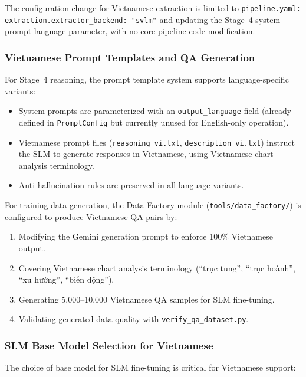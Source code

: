 The configuration change for Vietnamese extraction is limited to
\texttt{pipeline.yaml: extraction.extractor\_backend: "svlm"} and updating the
Stage~4 system prompt language parameter, with no core pipeline code modification.

\subsubsection{Vietnamese Prompt Templates and QA Generation}

For Stage~4 reasoning, the prompt template system supports language-specific variants:
\begin{itemize}
    \item System prompts are parameterized with an \texttt{output\_language} field
          (already defined in \texttt{PromptConfig} but currently unused for English-only
          operation).
    \item Vietnamese prompt files (\texttt{reasoning\_vi.txt}, \texttt{description\_vi.txt})
          instruct the SLM to generate responses in Vietnamese, using Vietnamese
          chart analysis terminology.
    \item Anti-hallucination rules are preserved in all language variants.
\end{itemize}

For training data generation, the Data Factory module (\texttt{tools/data\_factory/})
is configured to produce Vietnamese QA pairs by:
\begin{enumerate}
    \item Modifying the Gemini generation prompt to enforce 100\% Vietnamese output.
    \item Covering Vietnamese chart analysis terminology
          (``trục tung'',
          ``trục hoành'',
          ``xu hướng'',
          ``biến động'').
    \item Generating 5,000--10,000 Vietnamese QA samples for SLM fine-tuning.
    \item Validating generated data quality with \texttt{verify\_qa\_dataset.py}.
\end{enumerate}

\subsubsection{SLM Base Model Selection for Vietnamese}

The choice of base model for SLM fine-tuning is critical for Vietnamese support:

